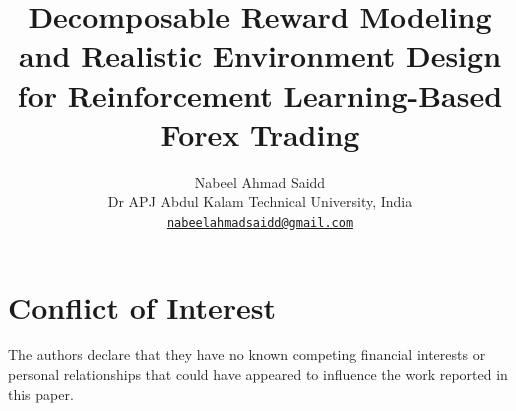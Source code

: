 \documentclass[10pt, twocolumn]{article}
\title{%
  \large\bfseries
  Decomposable Reward Modeling and Realistic Environment Design\\
  for Reinforcement Learning-Based Forex Trading%
}
\author{%
  \normalsize
  Nabeel Ahmad Saidd\\
  \small Dr APJ Abdul Kalam Technical University, India\\
  \href{mailto:nabeelahmadsaidd@gmail.com}{\texttt{nabeelahmadsaidd@gmail.com}}\\
}
\date{}
\begin{document}

\maketitle

\begin{abstract}
  
\end{abstract}









\section*{Conflict of Interest}
The authors declare that they have no known competing financial interests or personal relationships that could have appeared to influence the work reported in this paper.




\appendix




\end{document}
